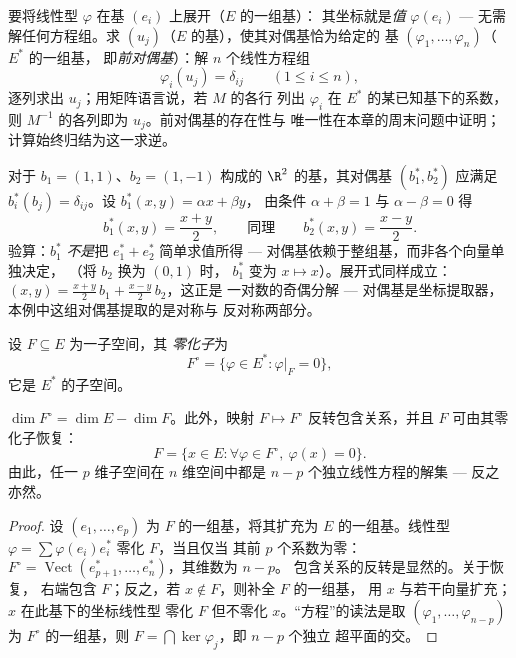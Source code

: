 \begin{method}[对偶基与前对偶基的实际应用]\label{met:b2:linalg:dualbasis}
要将线性型 $\varphi$ 在基 $(e_i)$ 上展开（$E$ 的一组基）：
其坐标就是\emph{值} $\varphi(e_i)$ --- 无需
解任何方程组。求 $(u_j)$（$E$ 的基），使其对偶基恰为给定的
基 $(\varphi_1, \dots, \varphi_n)$（$E^*$ 的一组基，
即\emph{前对偶基}）：解 $n$ 个线性方程组
\[
\varphi_i(u_j) = \delta_{ij} \qquad (1 \leq i \leq n),
\]
逐列求出 $u_j$；用矩阵语言说，若 $M$ 的各行
列出 $\varphi_i$ 在 $E^*$ 的某已知基下的系数，则
$M^{-1}$ 的各列即为 $u_j$。前对偶基的存在性与
唯一性在本章的周末问题中证明；
计算始终归结为这一求逆。
\end{method}

\begin{example}\label{ex:b2:linalg:dualbasis2d}
对于 $b_1 = (1, 1)$、$b_2 = (1, -1)$ 构成的 $\R^2$ 的基，其对偶基
$(b_1^*, b_2^*)$ 应满足 $b_i^*(b_j) =
\delta_{ij}$。设 $b_1^*(x, y) = \alpha x + \beta y$，
由条件 $\alpha + \beta = 1$ 与 $\alpha - \beta = 0$ 得
\[
b_1^*(x, y) = \frac{x + y}{2},
\qquad\text{同理}\qquad
b_2^*(x, y) = \frac{x - y}{2} .
\]
验算：$b_1^*$ \emph{不是}把 $e_1^* + e_2^*$ 简单求值所得 ---
对偶基依赖于整组基，而非各个向量单独决定，
（将 $b_2$ 换为 $(0, 1)$ 时，
$b_1^*$ 变为 $x \mapsto x$）。展开式同样成立：
$(x, y) = \frac{x+y}2\,b_1 + \frac{x-y}2\,b_2$，这正是
一对数的奇偶分解 --- 对偶基是坐标提取器，
本例中这组对偶基提取的是对称与
反对称两部分。
\end{example}

\begin{definition}[零化子]\label{def:b2:linalg:annihilator}
设 $F \subseteq E$ 为一子空间，其
\emph{零化子}为
\[
F^{\circ} = \{\varphi \in E^* : \varphi|_F = 0\},
\]
它是 $E^*$ 的子空间。
\end{definition}

\begin{theorem}[零化子的维数]\label{thm:b2:linalg:annihilator}
$\dim F^{\circ} = \dim E - \dim F$。此外，映射 $F \mapsto F^\circ$
反转包含关系，并且 $F$ 可由其零化子恢复：
\[
F = \{x \in E : \forall\varphi \in F^\circ,\ \varphi(x) = 0\}.
\]
由此，任一 $p$ 维子空间在 $n$ 维空间中都是
$n - p$ 个独立线性方程的解集 ---
反之亦然。
\end{theorem}

\begin{proof}
设 $(e_1, \dots, e_p)$ 为 $F$ 的一组基，将其扩充为
$E$ 的一组基。线性型 $\varphi = \sum \varphi(e_i) e_i^*$ 零化 $F$，当且仅当
其前 $p$ 个系数为零：$F^\circ =
\operatorname{Vect}(e_{p+1}^*, \dots, e_n^*)$，其维数为 $n - p$。
包含关系的反转是显然的。关于恢复，
右端包含 $F$；反之，若 $x \notin F$，则补全 $F$ 的一组基，
用 $x$ 与若干向量扩充；$x$ 在此基下的坐标线性型
零化 $F$ 但不零化 $x$。“方程”的读法是取
$(\varphi_1, \dots, \varphi_{n-p})$ 为 $F^\circ$ 的一组基，则 $F =
\bigcap \ker\varphi_j$，即 $n - p$ 个独立
超平面的交。
\end{proof}

